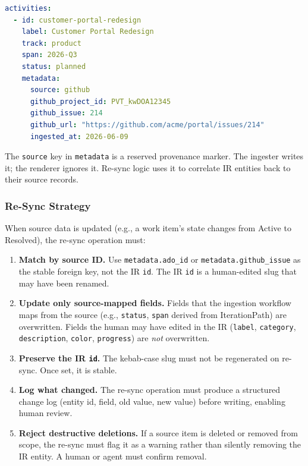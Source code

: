 \begin{lstlisting}[language=yaml,caption={Provenance metadata block (GitHub Projects example)}]
activities:
  - id: customer-portal-redesign
    label: Customer Portal Redesign
    track: product
    span: 2026-Q3
    status: planned
    metadata:
      source: github
      github_project_id: PVT_kwDOA12345
      github_issue: 214
      github_url: "https://github.com/acme/portal/issues/214"
      ingested_at: 2026-06-09
\end{lstlisting}

The \texttt{source} key in \texttt{metadata} is a reserved provenance marker. The
ingester writes it; the renderer ignores it. Re-sync logic uses it to correlate IR
entities back to their source records.

\subsubsection{Re-Sync Strategy}
\label{sec:resync}

When source data is updated (e.g., a work item's state changes from Active to Resolved),
the re-sync operation must:

\begin{enumerate}
  \item \textbf{Match by source ID.} Use \texttt{metadata.ado\_id} or
        \texttt{metadata.github\_issue} as the stable foreign key, not the IR \texttt{id}.
        The IR \texttt{id} is a human-edited slug that may have been renamed.
  \item \textbf{Update only source-mapped fields.} Fields that the ingestion workflow
        maps from the source (e.g., \texttt{status}, \texttt{span} derived from
        IterationPath) are overwritten. Fields the human may have edited in the IR
        (\texttt{label}, \texttt{category}, \texttt{description}, \texttt{color},
        \texttt{progress}) are \emph{not} overwritten.
  \item \textbf{Preserve the IR \texttt{id}.} The kebab-case slug must not be
        regenerated on re-sync. Once set, it is stable.
  \item \textbf{Log what changed.} The re-sync operation must produce a structured
        change log (entity id, field, old value, new value) before writing, enabling
        human review.
  \item \textbf{Reject destructive deletions.} If a source item is deleted or removed
        from scope, the re-sync must flag it as a warning rather than silently removing
        the IR entity. A human or agent must confirm removal.
\end{enumerate}

